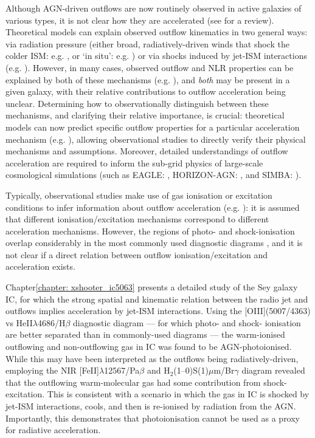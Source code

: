 Although AGN-driven outflows are now routinely observed in active galaxies of various types, it is not clear how they are accelerated (see \citealt{Wylezalek2018} for a review). Theoretical models can explain observed outflow kinematics in two general ways: via radiation pressure (either broad, radiatively-driven winds that shock the colder ISM: e.g. \citealt{Hopkins2010, Meena2021}, or `in situ': e.g. \citealt{Crenshaw2015, Revalski2018}) or via shocks induced by jet-ISM interactions (e.g. \citealt{Sutherland2007, Wagner2011, Mukherjee2016, Mukherjee2018}). However, in many cases, observed outflow and NLR properties can be explained by both of these mechanisms (e.g. \citealt{Ulvestad1981, Axon1998, Das2005, Das2006, Mukherjee2016, Mukherjee2018, Meena2021}), and \textit{both} may be present in a given galaxy, with their relative contributions to outflow acceleration being unclear. Determining how to observationally distinguish between these mechanisms, and clarifying their relative importance, is crucial: theoretical models can now predict specific outflow properties for a particular acceleration mechanism (e.g. \citealt{Richings2021, Meenakshi2022a, Meenakshi2022b}), allowing observational studies to directly verify their physical mechanisms and assumptions. Moreover, detailed understandings of outflow acceleration are required to inform the sub-grid physics of large-scale cosmological simulations (such as EAGLE: \citealt{Schaye2015}, HORIZON-AGN: \citealt{Dubois2016}, and SIMBA: \citealt{Dave2019}).

Typically, observational studies make use of gas ionisation or excitation conditions to infer information about outflow acceleration (e.g. \citealt{Mingozzi2019, Venturi2021, Revalski2021}): it is assumed that different ionisation/excitation mechanisms correspond to different acceleration mechanisms. However, the regions of photo- and shock-ionisation overlap considerably in the most commonly used diagnostic diagrams \citep{Dopita1995, Dopita1996, Allen2008, Ji2020}, and it is not clear if a direct relation between outflow ionisation/excitation and acceleration exists.

Chapter\;\ref{chapter: xshooter_ic5063} presents a detailed study of the Sey galaxy IC, for which the strong spatial and kinematic relation between the radio jet and outflows implies acceleration by jet-ISM interactions. Using the [OIII](5007/4363) vs He\;II$\lambda$4686/H$\beta$ diagnostic diagram \citep{VillarMartin1999} --- for which photo- and shock- ionisation are better separated than in commonly-used diagrams --- the warm-ionised outflowing and non-outflowing gas in IC was found to be AGN-photoionised. While this may have been interpreted as the outflows being radiatively-driven, employing the NIR [FeII]$\lambda$12567/Pa$\beta$ and H$_2$(1--0)S(1)\;$\mu$m/Br$\gamma$ diagram \citep{Larkin1998, Rodriguez-Ardila2005, Riffel2013a, Colina2015, Riffel2021} revealed that the outflowing warm-molecular gas had some contribution from shock-excitation. This is consistent with a scenario in which the gas in IC is shocked by jet-ISM interactions, cools, and then is re-ionised by radiation from the AGN. Importantly, this demonstrates that photoionisation cannot be used as a proxy for radiative acceleration.

